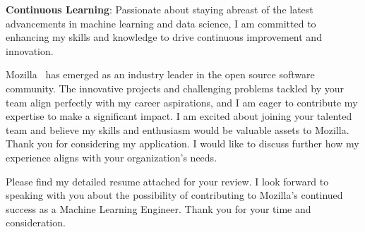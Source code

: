 \documentclass[11pt, a4paper]{awesome-cv} %
\newcommand{\Hiring}{Mozilla}
\newcommand{\industry}{open source software community}
\begin{document}
\begin{cvletter}
\textbf{Continuous Learning}: Passionate about staying abreast of the latest advancements in machine learning and data science, I am committed to enhancing my skills and knowledge to drive continuous improvement and innovation.

\Hiring~ has emerged as an industry leader in the \industry. The innovative projects and challenging problems tackled by your team align perfectly with my career aspirations, and I am eager to contribute my expertise to make a significant impact.
I am excited about joining your talented team and believe my skills and enthusiasm would be valuable assets to \Hiring. Thank you for considering my application. I would like to discuss further how my experience aligns with your organization's needs.

Please find my detailed resume attached for your review. I look forward to speaking with you about the possibility of contributing to \Hiring's continued success as a Machine Learning Engineer.
Thank you for your time and consideration.


\end{cvletter}


\makeletterclosing %
\end{document}
